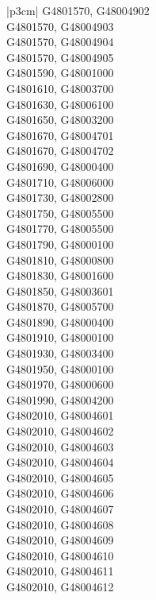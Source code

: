 \begin{customLongTable}{ |p{3cm}| }
G4801570, G48004902 \\ \hline
G4801570, G48004903 \\ \hline
G4801570, G48004904 \\ \hline
G4801570, G48004905 \\ \hline
G4801590, G48001000 \\ \hline
G4801610, G48003700 \\ \hline
G4801630, G48006100 \\ \hline
G4801650, G48003200 \\ \hline
G4801670, G48004701 \\ \hline
G4801670, G48004702 \\ \hline
G4801690, G48000400 \\ \hline
G4801710, G48006000 \\ \hline
G4801730, G48002800 \\ \hline
G4801750, G48005500 \\ \hline
G4801770, G48005500 \\ \hline
G4801790, G48000100 \\ \hline
G4801810, G48000800 \\ \hline
G4801830, G48001600 \\ \hline
G4801850, G48003601 \\ \hline
G4801870, G48005700 \\ \hline
G4801890, G48000400 \\ \hline
G4801910, G48000100 \\ \hline
G4801930, G48003400 \\ \hline
G4801950, G48000100 \\ \hline
G4801970, G48000600 \\ \hline
G4801990, G48004200 \\ \hline
G4802010, G48004601 \\ \hline
G4802010, G48004602 \\ \hline
G4802010, G48004603 \\ \hline
G4802010, G48004604 \\ \hline
G4802010, G48004605 \\ \hline
G4802010, G48004606 \\ \hline
G4802010, G48004607 \\ \hline
G4802010, G48004608 \\ \hline
G4802010, G48004609 \\ \hline
G4802010, G48004610 \\ \hline
G4802010, G48004611 \\ \hline
G4802010, G48004612 \\ \hline

\end{customLongTable}
